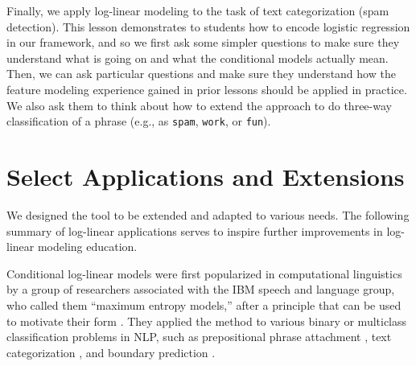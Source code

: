 \documentclass[11pt,letterpaper]{article}
\begin{document}
Finally, we apply log-linear modeling to the task of text categorization (spam detection). This lesson demonstrates to students how to encode logistic regression in our framework, and so 
we first ask some simpler questions to make sure they understand what is going on and what the conditional models actually mean.
Then, we can ask particular questions and make sure they understand how the feature modeling experience gained in 
prior lessons should be applied in practice. We also ask them to think about how to extend the approach to do three-way classification 
of a phrase (e.g., as \texttt{spam}, \texttt{work}, or \texttt{fun}).



\section{Select Applications and Extensions} \label{sec:history}
We designed the tool to be extended and adapted to various needs. 
The following summary of log-linear applications serves to inspire 
further improvements in log-linear modeling education.

Conditional log-linear models were first popularized in computational
linguistics by a group of researchers associated with the IBM speech
and language group, who called them ``maximum entropy models,'' after
a principle that can be used to motivate their form
\cite{jaynes-1957}.  They applied the method to various binary or
multiclass classification problems in NLP, such as prepositional
phrase attachment \cite{ratnaparkhi-1994}, text categorization
\cite{nigam-lafferty-mccallum-1999}, and boundary prediction
\cite{beeferman-berger-lafferty-1999}.
\end{document}
